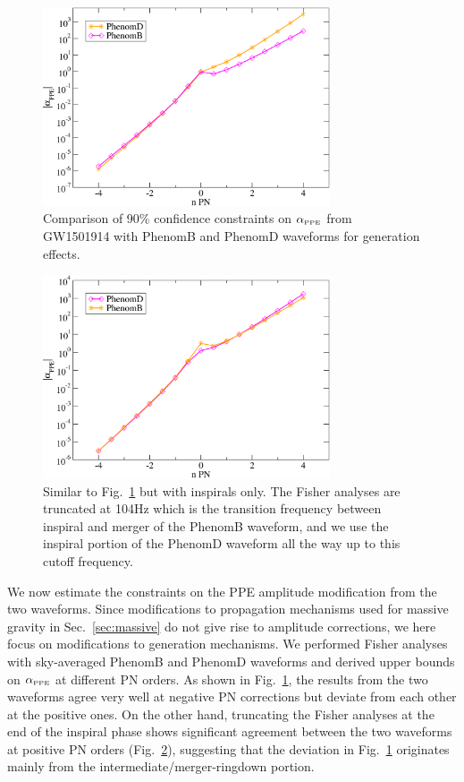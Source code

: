 \documentclass[prd,twocolumn,nofootinbib]{revtex4-1}
\newcommand{\PPE}{{\mbox{\tiny PPE}}}
\begin{document}
\begin{figure}[htb]
\includegraphics[width=8.5cm]{phenomBvsphenomD.pdf}
\caption{Comparison of 90\% confidence constraints on $\alpha_{\PPE}$ from GW1501914 with PhenomB and PhenomD waveforms for generation effects. }
\label{fig:phenomBvsD}
\end{figure}

\begin{figure}[htb]
\includegraphics[width=8.5cm]{phenomBvsphenomD-insp.pdf}
\caption{Similar to Fig.~\ref{fig:phenomBvsD} but with inspirals only. The Fisher analyses are truncated at 104Hz which is the transition frequency between inspiral and merger of the PhenomB waveform, and we use the inspiral portion of the PhenomD waveform all the way up to this cutoff frequency.}
\label{fig:phenomBvsD-insp}
\end{figure}

We now estimate the constraints on the PPE amplitude modification from the two waveforms. Since modifications to propagation mechanisms used for massive gravity in Sec.~\ref{sec:massive} do not give rise to amplitude corrections, we here focus on modifications to generation mechanisms. We performed Fisher analyses with sky-averaged PhenomB and PhenomD waveforms and derived upper bounds on $\alpha_{\PPE}$ at different PN orders. As shown in Fig.~\ref{fig:phenomBvsD}, the results from the two waveforms agree very well at negative PN corrections but deviate from each other at the positive ones. 
On the other hand, truncating the Fisher analyses at the end of the inspiral phase shows significant agreement between the two waveforms at positive PN orders (Fig.~\ref{fig:phenomBvsD-insp}), suggesting that the deviation in Fig.~\ref{fig:phenomBvsD} originates mainly from the intermediate/merger-ringdown portion.
\end{document}
